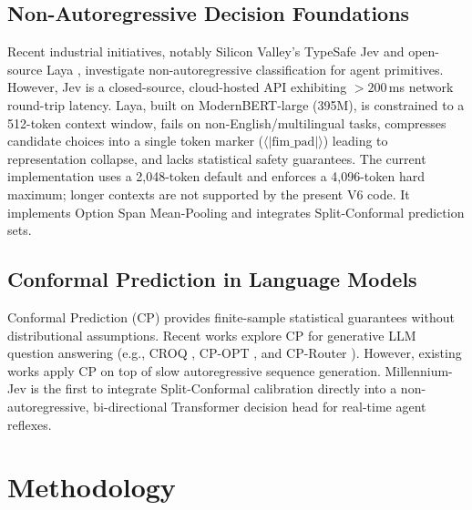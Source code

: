 \documentclass[11pt,a4paper]{article}
\begin{document}
\subsection{Non-Autoregressive Decision Foundations}
Recent industrial initiatives, notably Silicon Valley's TypeSafe Jev \cite{alphamatch2025jev} and open-source Laya \cite{laya2025modernbert}, investigate non-autoregressive classification for agent primitives. However, Jev is a closed-source, cloud-hosted API exhibiting $>200$\,ms network round-trip latency. Laya, built on ModernBERT-large (395M), is constrained to a 512-token context window, fails on non-English/multilingual tasks, compresses candidate choices into a single token marker ($\langle|\text{fim\_pad}|\rangle$) leading to representation collapse, and lacks statistical safety guarantees. The current implementation uses a 2,048-token default and enforces a 4,096-token hard maximum; longer contexts are not supported by the present V6 code. It implements Option Span Mean-Pooling and integrates Split-Conformal prediction sets.

\subsection{Conformal Prediction in Language Models}
Conformal Prediction (CP) \cite{vovk2005algorithmic, angelopoulos2021gentle} provides finite-sample statistical guarantees without distributional assumptions. Recent works explore CP for generative LLM question answering (e.g., CROQ \cite{croq2024}, CP-OPT \cite{cpopt2024}, and CP-Router \cite{cprouter2024}). However, existing works apply CP on top of slow autoregressive sequence generation. Millennium-Jev is the first to integrate Split-Conformal calibration directly into a non-autoregressive, bi-directional Transformer decision head for real-time agent reflexes.

\section{Methodology}
\end{document}

